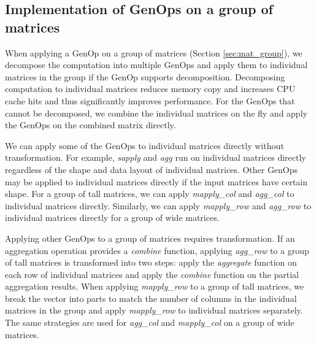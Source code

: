 \subsection{Implementation of GenOps on a group of matrices}

When applying a GenOp on a group of matrices (Section \ref{sec:mat_group}),
we decompose the computation into multiple GenOps and apply them to individual
matrices in the group if the GenOp supports decomposition. Decomposing computation
to individual matrices reduces memory copy and increases CPU cache hits and thus
significantly improves performance. For the GenOps that cannot be decomposed,
we combine the individual matrices on the fly and apply the GenOps on the combined
matrix directly.

We can apply some of the GenOps to individual matrices directly without
transformation. For example,
\textit{sapply} and \textit{agg} run on individual matrices directly regardless
of the shape and data layout of individual matrices. Other GenOps may be applied
to individual matrices directly if the input matrices have certain shape. For
a group of tall matrices, we can apply
\textit{mapply\_col} and \textit{agg\_col} to individual matrices directly.
Similarly, we can apply \textit{mapply\_row} and \textit{agg\_row} to
individual matrices directly for a group of wide matrices. %

Applying other GenOps to a group of matrices requires transformation. If an aggregation
operation provides a \textit{combine} function, applying \textit{agg\_row} to a group of
tall matrices is transformed into two steps: apply the \textit{aggregate} function on
each row of individual matrices and apply the \textit{combine} function on the partial
aggregation results. When applying \textit{mapply\_row} to a group of tall matrices,
we break the vector into parts to match the number of columns in the individual
matrices in the group and apply \textit{mapply\_row} to individual matrices
separately. The same strategies are used for \textit{agg\_col} and
\textit{mapply\_col} on a group of wide matrices. 

